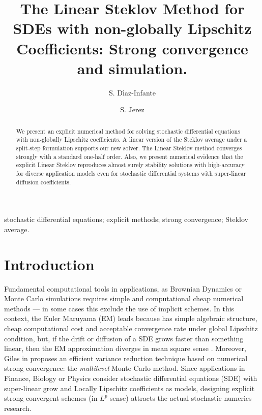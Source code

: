 \documentclass[sort&compress, preprint]{elsarticle}
\theoremstyle{definition}
\theoremstyle{plain}%
\theoremstyle{remark}
\begin{document}
	\begin{frontmatter}
		\title{
				The Linear Steklov Method
				for SDEs with 
				non-globally Lipschitz Coefficients: Strong convergence and simulation.
		}%
		\author[sj]{S. D\'{\i}az-Infante}
		\author[sj]{S. Jerez}
		\address[sj]{Split Step Linear Steklov Method 
		Department of Applied Mathematics, CIMAT, Guanajuato, Gto., Mexico,
		36240.
		}
	\begin{abstract}
		We present an explicit  numerical method for
		solving stochastic differential equations  with non-globally Lipschitz
		coefficients. A linear version of the Steklov average under a split-step formulation supports our new solver.
		The Linear Steklov method converges strongly with a standard 
		one-half order.  Also, we present numerical evidence that the explicit 
		Linear Steklov reproduces almost surely stability solutions with  
		high-accuracy for diverse application models  even  for stochastic differential systems 
		with super-linear diffusion coefficients.
	\end{abstract}
	\begin{keyword}
		stochastic differential equations;
		explicit methods; strong convergence; Steklov average.
	\end{keyword}
	\end{frontmatter}
	

\section{Introduction} 

	Fundamental computational tools in applications,  as Brownian Dynamics \cite{Cruz2012} or Monte Carlo simulations 
\cite{Glasserman2004} requires simple and computational cheap numerical methods  --- 
in some cases this exclude the use of implicit schemes.
In this context, the Euler Maruyama (EM) leads because has simple algebraic structure, 
cheap computational cost and acceptable convergence rate under global Lipschitz condition, but, if the drift or 
diffusion of a SDE grows faster than something linear, then the EM approximation diverges  in mean square sense 
\cite{Hutzenthaler2009, Hutzenthaler2010, Hutzenthaler2012b}.
Moreover, Giles in \cite{Giles2008} proposes an efficient variance reduction technique based on numerical strong 
convergence: the \emph{multilevel}  Monte Carlo method. 
Since applications in Finance, Biology or Physics consider stochastic differential equations (SDE) with super-linear
grow and Locally Lipschitz coefficients as models, designing explicit strong convergent schemes (in $L^p$ sense)
attracts the actual stochastic numerics research. 
\end{document}
